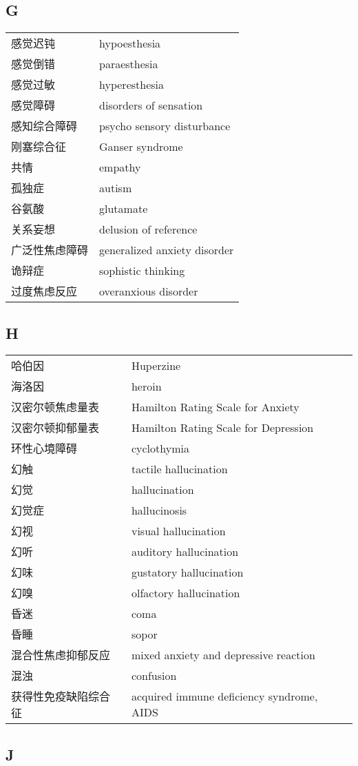 \subsection*{G}

\begin{longtable}[]{@{}ll@{}}
\toprule
\endhead
感觉迟钝 & hypoesthesia\tabularnewline
感觉倒错 & paraesthesia\tabularnewline
感觉过敏 & hyperesthesia\tabularnewline
感觉障碍 & disorders of sensation\tabularnewline
感知综合障碍 & psycho sensory disturbance\tabularnewline
刚塞综合征 & Ganser syndrome\tabularnewline
共情 & empathy\tabularnewline
孤独症 & autism\tabularnewline
谷氨酸 & glutamate\tabularnewline
关系妄想 & delusion of reference\tabularnewline
广泛性焦虑障碍 & generalized anxiety disorder\tabularnewline
诡辩症 & sophistic thinking\tabularnewline
过度焦虑反应 & overanxious disorder\tabularnewline
\bottomrule
\end{longtable}

\subsection*{H}

\begin{longtable}[]{@{}ll@{}}
\toprule
\endhead
哈伯因 & Huperzine\tabularnewline
海洛因 & heroin\tabularnewline
汉密尔顿焦虑量表 & Hamilton Rating Scale for Anxiety\tabularnewline
汉密尔顿抑郁量表 & Hamilton Rating Scale for Depression\tabularnewline
环性心境障碍 & cyclothymia\tabularnewline
幻触 & tactile hallucination\tabularnewline
幻觉 & hallucination\tabularnewline
幻觉症 & hallucinosis\tabularnewline
幻视 & visual hallucination\tabularnewline
幻听 & auditory hallucination\tabularnewline
幻味 & gustatory hallucination\tabularnewline
幻嗅 & olfactory hallucination\tabularnewline
昏迷 & coma\tabularnewline
昏睡 & sopor\tabularnewline
混合性焦虑抑郁反应 & mixed anxiety and depressive
reaction\tabularnewline
混浊 & confusion\tabularnewline
获得性免疫缺陷综合征 & acquired immune deficiency syndrome,
AIDS\tabularnewline
\bottomrule
\end{longtable}

\subsection*{J}

